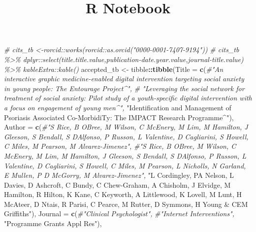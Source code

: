 \documentclass[
]{article}
\title{R Notebook}
\author{}
\date{\vspace{-2.5em}}
\newenvironment{Shaded}{\begin{snugshade}}{\end{snugshade}}
\newcommand{\CommentTok}[1]{\textcolor[rgb]{0.56,0.35,0.01}{\textit{#1}}}
\newcommand{\DataTypeTok}[1]{\textcolor[rgb]{0.13,0.29,0.53}{#1}}
\newcommand{\KeywordTok}[1]{\textcolor[rgb]{0.13,0.29,0.53}{\textbf{#1}}}
\newcommand{\NormalTok}[1]{#1}
\newcommand{\OperatorTok}[1]{\textcolor[rgb]{0.81,0.36,0.00}{\textbf{#1}}}
\newcommand{\StringTok}[1]{\textcolor[rgb]{0.31,0.60,0.02}{#1}}
\begin{document}
\maketitle

\begin{Shaded}
\begin{Highlighting}[]
\CommentTok{\# cits\_tb \textless{}{-}rorcid::works(rorcid::as.orcid("0000{-}0001{-}7407{-}9194"))}
\CommentTok{\# cits\_tb \%\textgreater{}\% dplyr::select(title.title.value,\textasciigrave{}publication{-}date.year.value\textasciigrave{},\textasciigrave{}journal{-}title.value\textasciigrave{}) \%\textgreater{}\% kableExtra::kable()}
\NormalTok{accepted\_tb \textless{}{-}}\StringTok{ }\NormalTok{tibble}\OperatorTok{::}\KeywordTok{tibble}\NormalTok{(}\DataTypeTok{Title =} \KeywordTok{c}\NormalTok{(}\CommentTok{\#"An interactive graphic medicine{-}enabled digital intervention targeting social anxiety in young people: The Entourage Project\^{}",}
                                       \CommentTok{\# "Leveraging the social network for treatment of social anxiety: Pilot study of a youth{-}specific digital intervention with a focus on engagement of young men\^{}",}
                                        \StringTok{"Identification and Management of Psoriasis Associated Co{-}MorbidiTy: The IMPACT Research Programme\^{}"}\NormalTok{),}
                              \DataTypeTok{Author =} \KeywordTok{c}\NormalTok{(}\CommentTok{\#"S Rice, B O\textquotesingle{}Bree, M Wilson, C McEnery, M Lim, M Hamilton, J Gleeson, S Bendall, S D\textquotesingle{}Alfonso, P Russon, L Valentine, D Cagliarini, S Howell, C Miles, M Pearson, M Alvarez{-}Jimenez",}
                                         \CommentTok{\#"S Rice, B O\textquotesingle{}Bree, M Wilson, C McEnery, M Lim, M Hamilton, J Gleeson, S Bendall, S D\textquotesingle{}Alfonso, P Russon, L Valentine, D Cagliarini, S Howell, C Miles, M Pearson, L Nicholls, N Garland, E Mullen, P D McGorry, M Alvarez{-}Jimenez",}
                                         \StringTok{"L Cordingley, PA Nelson, L Davies, D Ashcroft, C Bundy, C Chew{-}Graham, A Chisholm, J Elvidge, M Hamilton, R Hilton, K Kane, C Keyworth, A Littlewood, K Lovell, M Lunt, H McAteer, D Ntais, R Parisi, C Pearce, M Rutter, D Symmons, H Young  \& CEM Griffiths"}\NormalTok{),}
                              \DataTypeTok{Journal =} \KeywordTok{c}\NormalTok{(}\CommentTok{\#"Clinical Psychologist",}
                                          \CommentTok{\#"Internet Interventions",}
                                          \StringTok{"Programme Grants Appl Res"}\NormalTok{),}

\end{Highlighting}
\end{Shaded}
\end{document}
